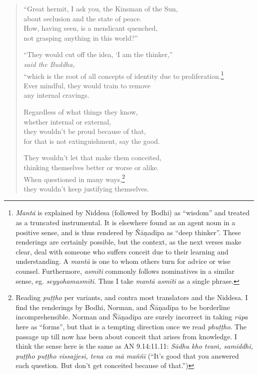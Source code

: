 \documentclass[12pt,openany]{book}%
\newcommand*{\scspeaker}[1]{\hspace{2em}\textit{#1}}
\begin{document}
\begin{verse}%
“Great hermit, I ask you, the Kinsman of the Sun, \\
about seclusion and the state of peace. \\
How, having seen, is a mendicant quenched, \\
not grasping anything in this world?” 

“They would cut off the idea, ‘I am the thinker,” \\
\scspeaker{said the Buddha, }\\
“which is the root of all concepts of identity due to proliferation.\footnote{\textit{\textsanskrit{Mantā}} is explained by Niddesa (followed by Bodhi) as “wisdom” and treated as a truncated instrumental. It is elsewhere found as an agent noun in a positive sense, and is thus rendered by \textsanskrit{Ñāṇadīpa} as “deep thinker”. These renderings are certainly possible, but the context, as the next verses make clear, deal with someone who suffers conceit due to their learning and understanding. A \textit{\textsanskrit{mantā}} is one to whom others turn for advice or wise counsel. Furthermore, \textit{\textsanskrit{asmīti}} commonly follows nominatives in a similar sense, eg. \textit{\textsanskrit{seyyohamasmīti}}. Thus I take \textit{\textsanskrit{mantā} \textsanskrit{asmīti}} as a single phrase. } \\
Ever mindful, they would train to remove \\
any internal cravings. 

Regardless of what things they know, \\
whether internal or external, \\
they wouldn’t be proud because of that, \\
for that is not extinguishment, say the good. 

They wouldn’t let that make them conceited, \\
thinking themselves better or worse or alike. \\
When questioned in many ways,\footnote{Reading \textit{\textsanskrit{puṭṭho}} per variants, and contra most translators and the Niddesa. I find the renderings by Bodhi, Norman, and \textsanskrit{Ñāṇadīpa} to be borderline incomprehensible. Norman and \textsanskrit{Ñāṇadīpa} are surely incorrect in taking \textit{\textsanskrit{rūpa}} here as “forms”, but that is a tempting direction once we read \textit{\textsanskrit{phuṭṭho}}. The passage up till now has been about conceit that arises from knowledge. I think the sense here is the same as AN 9.14:11.11: \textit{\textsanskrit{Sādhu} kho \textsanskrit{tvaṁ}, samiddhi, \textsanskrit{puṭṭho} \textsanskrit{puṭṭho} vissajjesi, tena ca \textsanskrit{mā} \textsanskrit{maññī}} (“It’s good that you answered each question. But don’t get conceited because of that.”) } \\
they wouldn’t keep justifying themselves. 


\end{verse}
\end{document}
